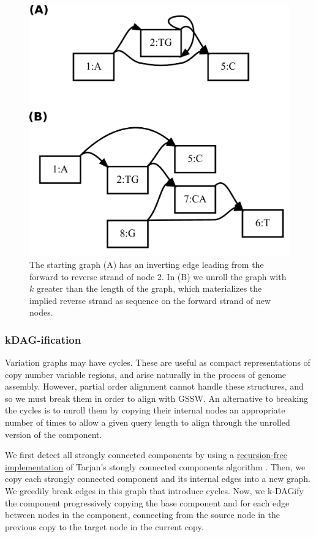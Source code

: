 \documentclass{article}
\begin{document}
\begin{figure}[t]
\centering
\includegraphics[width=1.0\textwidth]{figures/unfold}
\caption{\label{fig:unfold}
  The starting graph (A) has an inverting edge leading from the forward to reverse strand of node 2.
  In (B) we unroll the graph with $k$ greater than the length of the graph, which materializes the implied reverse strand as sequence on the forward strand of new nodes.
}
\end{figure}

\subsubsection{kDAG-ification}

Variation graphs may have cycles.
These are useful as compact representations of copy number variable regions, and arise naturally in the process of genome assembly.
However, partial order alignment cannot handle these structures, and so we must break them in order to align with GSSW.
An alternative to breaking the cycles is to unroll them by copying their internal nodes an appropriate number of times to allow a given query length to align through the unrolled version of the component.

We first detect all strongly connected components by using a \href{https://github.com/vgteam/vg/blob/fbcb6e62/src/vg.cpp#L3508-L3552}{recursion-free implementation} of Tarjan's stongly connected components algorithm \cite{tarjan1972depth}.
Then, we copy each strongly connected component and its internal edges into a new graph.
We greedily break edges in this graph that introduce cycles.
Now, we k-DAGify the component progressively copying the base component and for each edge between nodes in the component, connecting from the source node in the previous copy to the target node in the current copy.
\end{document}
